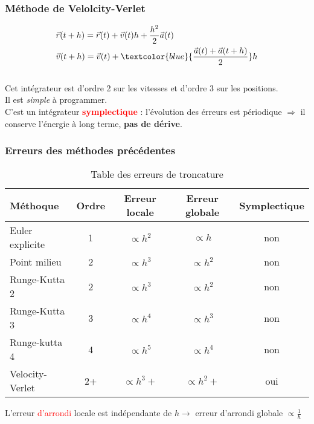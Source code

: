 \documentclass{beamer}
\begin{document}
\begin{frame}
\frametitle{Méthode de Velolcity-Verlet}
\begin{align*}
& \vec{r}(t+h) = \vec{r}(t) + \vec{v}(t)h + \frac{h^2}{2}\vec{a}(t)\\
& \vec{v}(t+h) = \vec{v}(t) + \textcolor{blue}{\frac{\vec{a}(t) + \vec{a}(t+h)}{2}}h
\end{align*}
\vspace{0.4cm}
\\
Cet intégrateur est d'ordre 2 sur les vitesses et d'ordre 3 sur les positions.\\
\vspace{0.4cm}
Il est \textit{simple} à programmer. \\
\vspace{0.6cm}
\large
C'est un intégrateur \textbf{\textcolor{red}{symplectique}} : l'évolution des érreurs est périodique $\Rightarrow$ il conserve l'énergie à long terme, \textbf{pas de dérive}.

\end{frame}


\begin{frame}
\frametitle{Erreurs des méthodes précédentes}
\begin{table}[t]
	\small
	\centering
	\begin{tabular}{|l | c | c | c | c |}        
	\hline
	Méthoque & Ordre & Erreur locale & Erreur globale & Symplectique \\
	\hline
	Euler explicite & 1 & $\propto h^2$ & $\propto h$ & non \\
	Point milieu & 2 & $\propto h^3$ & $\propto h^2$ & non \\
	Runge-Kutta 2 & 2 & $\propto h^3$ & $\propto h^2$ & non \\
	Runge-Kutta 3 & 3 & $\propto h^4$ & $\propto h^3$ & non \\
	Runge-kutta 4 & 4 & $\propto h^5$ & $\propto h^4$ & non\\
	Velocity-Verlet & 2+ & $\propto h^3+$ & $\propto h^2+$ & oui \\
	\hline
	\end{tabular}
	\vspace{0.1cm}
	\caption{Table des erreurs de troncature}
	\label{tab_orion_only}
	\end{table}
	\small
	L'erreur \textcolor{red}{d'arrondi} locale est indépendante de $h \rightarrow$ erreur d'arrondi globale $\propto \frac{1}{h}$ 
\end{frame}
\end{document}
